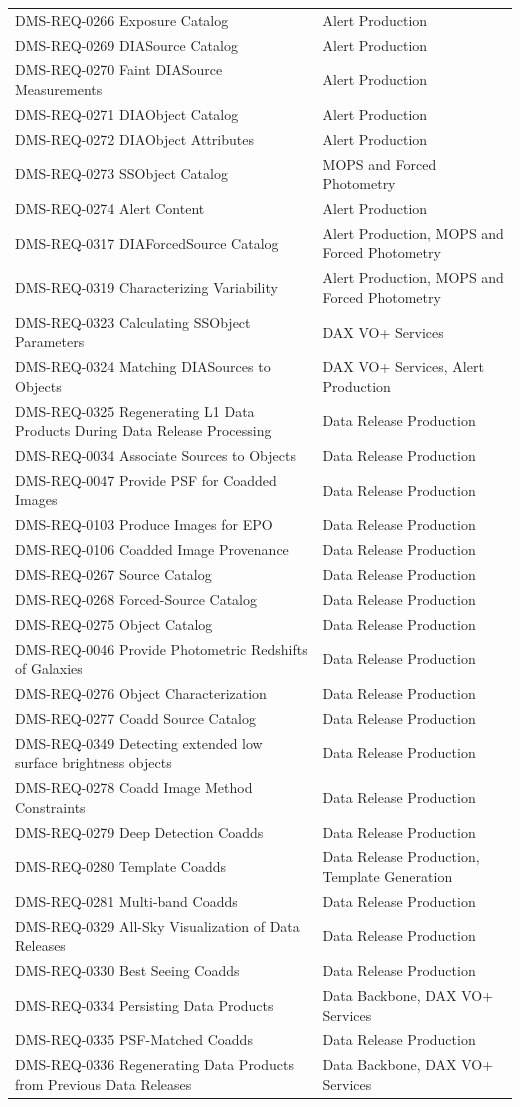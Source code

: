 \documentclass[]{article}
\begin{document}
\begin{longtable}[]{@{}ll@{}}
DMS-REQ-0266 Exposure Catalog & Alert Production\tabularnewline
DMS-REQ-0269 DIASource Catalog & Alert Production\tabularnewline
DMS-REQ-0270 Faint DIASource Measurements & Alert
Production\tabularnewline
DMS-REQ-0271 DIAObject Catalog & Alert Production\tabularnewline
DMS-REQ-0272 DIAObject Attributes & Alert Production\tabularnewline
DMS-REQ-0273 SSObject Catalog & MOPS and Forced
Photometry\tabularnewline
DMS-REQ-0274 Alert Content & Alert Production\tabularnewline
DMS-REQ-0317 DIAForcedSource Catalog & Alert Production, MOPS and Forced
Photometry\tabularnewline
DMS-REQ-0319 Characterizing Variability & Alert Production, MOPS and
Forced Photometry\tabularnewline
DMS-REQ-0323 Calculating SSObject Parameters & DAX VO+
Services\tabularnewline
DMS-REQ-0324 Matching DIASources to Objects & DAX VO+ Services, Alert
Production\tabularnewline
DMS-REQ-0325 Regenerating L1 Data Products During Data Release
Processing & Data Release Production\tabularnewline
DMS-REQ-0034 Associate Sources to Objects & Data Release
Production\tabularnewline
DMS-REQ-0047 Provide PSF for Coadded Images & Data Release
Production\tabularnewline
DMS-REQ-0103 Produce Images for EPO & Data Release
Production\tabularnewline
DMS-REQ-0106 Coadded Image Provenance & Data Release
Production\tabularnewline
DMS-REQ-0267 Source Catalog & Data Release Production\tabularnewline
DMS-REQ-0268 Forced-Source Catalog & Data Release
Production\tabularnewline
DMS-REQ-0275 Object Catalog & Data Release Production\tabularnewline
DMS-REQ-0046 Provide Photometric Redshifts of Galaxies & Data Release
Production\tabularnewline
DMS-REQ-0276 Object Characterization & Data Release
Production\tabularnewline
DMS-REQ-0277 Coadd Source Catalog & Data Release
Production\tabularnewline
DMS-REQ-0349 Detecting extended low surface brightness objects & Data
Release Production\tabularnewline
DMS-REQ-0278 Coadd Image Method Constraints & Data Release
Production\tabularnewline
DMS-REQ-0279 Deep Detection Coadds & Data Release
Production\tabularnewline
DMS-REQ-0280 Template Coadds & Data Release Production, Template
Generation\tabularnewline
DMS-REQ-0281 Multi-band Coadds & Data Release Production\tabularnewline
DMS-REQ-0329 All-Sky Visualization of Data Releases & Data Release
Production\tabularnewline
DMS-REQ-0330 Best Seeing Coadds & Data Release Production\tabularnewline
DMS-REQ-0334 Persisting Data Products & Data Backbone, DAX VO+
Services\tabularnewline
DMS-REQ-0335 PSF-Matched Coadds & Data Release Production\tabularnewline
DMS-REQ-0336 Regenerating Data Products from Previous Data Releases &
Data Backbone, DAX VO+ Services\tabularnewline

\end{longtable}
\end{document}
